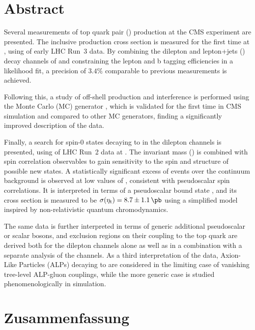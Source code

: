 \cleardoublepage %
\chapter*{Abstract}

Several measurements of top quark pair (\ttbar) production at the CMS experiment are presented. The inclusive \ttbar production cross section \sigmatt is measured for the first time at \sqrtsRIII, using \lumiRIII of early LHC Run~3 data. By combining the dilepton and lepton+jets (\ljets) decay channels of \ttbar and constraining the lepton and b tagging efficiencies in a likelihood fit, a precision of $3.4\%$ comparable to previous \sigmatt measurements is achieved.

Following this, a study of off-shell \ttbar production and \tttW interference is performed using the Monte Carlo (MC) generator \bbfourl, which is validated for the first time in CMS simulation and compared to other MC generators, finding a significantly improved description of the data.

Finally, a search for spin-0 states decaying to \ttbar in the dilepton channels is presented, using \lumiRII of LHC Run~2 data at \sqrtsRII. The invariant \ttbar mass (\mtt) is combined with spin correlation observables to gain sensitivity to the spin and \CP structure of possible new states. A statistically significant excess of events over the \ttbar continuum background is observed at low values of \mtt, consistent with pseudoscalar spin correlations. It is interpreted in terms of a pseudoscalar \ttbar bound state \etat, and its cross section is measured to be $\sigetat =  8.7 \pm 1.1  \, \si{\pb}$ using a simplified model inspired by non-relativistic quantum chromodynamics. 

The same data is further interpreted in terms of generic additional pseudoscalar or scalar bosons, and exclusion regions on their coupling to the top quark are derived both for the dilepton channels alone as well as in a combination with a separate analysis of the \ljets channels. As a third interpretation of the data, Axion-Like Particles (ALPs) decaying to \ttbar are considered in the limiting case of vanishing tree-level ALP-gluon couplings, while the more generic case is studied phenomenologically in simulation.

\cleardoublepage %
\chapter*{Zusammenfassung}

